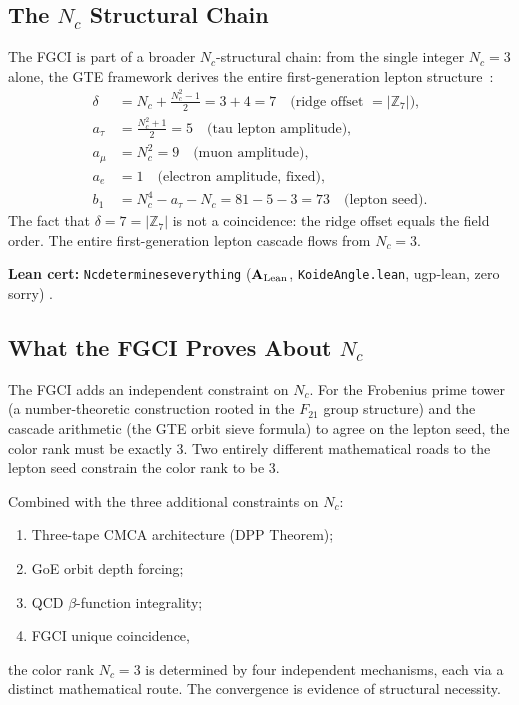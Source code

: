 \documentclass[11pt,openany]{book}
\theoremstyle{remark}
\newcommand{\lean}[1]{%
  \penalty-100
  \begingroup\def\_{\textunderscore\allowbreak}\texttt{#1}\endgroup}
\newcommand{\CatAL}{\ensuremath{\textbf{A}_{\rm Lean}}}
\begin{document}
\subsection*{The $N_c$ Structural Chain}

The FGCI is part of a broader $N_c$-structural chain: from the single integer
$N_c = 3$ alone, the GTE framework derives the entire first-generation lepton
structure~\cite{SpivackGTEPolynomialUFT}:
\begin{align}
  \delta &= N_c + \tfrac{N_c^2-1}{2} = 3 + 4 = 7
    \quad \text{(ridge offset $= |\mathbb{Z}_7|$)}, \\
  a_\tau &= \tfrac{N_c^2+1}{2} = 5 \quad \text{(tau lepton amplitude)}, \\
  a_\mu  &= N_c^2 = 9            \quad \text{(muon amplitude)}, \\
  a_e    &= 1                    \quad \text{(electron amplitude, fixed)}, \\
  b_1    &= N_c^4 - a_\tau - N_c = 81 - 5 - 3 = 73 \quad \text{(lepton seed)}.
\end{align}
The fact that $\delta = 7 = |\mathbb{Z}_7|$ is not a coincidence: the ridge offset
equals the field order. The entire first-generation lepton cascade flows from $N_c = 3$.

\textbf{Lean cert:} \lean{N\_c\_determines\_everything} (\CatAL,
\texttt{KoideAngle.lean}, ugp-lean, zero sorry) \cite{Spivack2026_Koide}.

\subsection*{What the FGCI Proves About $N_c$}

The FGCI adds an independent constraint on $N_c$. For the Frobenius prime tower
(a number-theoretic construction rooted in the $F_{21}$ group structure) and the
cascade arithmetic (the GTE orbit sieve formula) to agree on the lepton seed, the
color rank must be exactly 3. Two entirely different mathematical roads to the lepton
seed constrain the color rank to be 3.

Combined with the three additional constraints on $N_c$:
\begin{enumerate}[label=\textup{(\arabic*)},itemsep=2pt]
\item Three-tape CMCA architecture (DPP Theorem);
\item GoE orbit depth forcing;
\item QCD $\beta$-function integrality;
\item FGCI unique coincidence,
\end{enumerate}
the color rank $N_c = 3$ is determined by four independent mechanisms, each via a
distinct mathematical route. The convergence is evidence of structural necessity.
\end{document}
